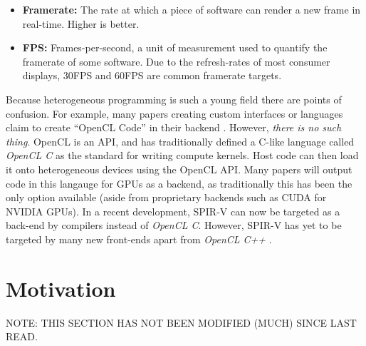 \documentclass[a4paper,12pt,twoside,openright]{report}
\begin{document}
\begin{itemize}
    \item \textbf{Framerate:} The rate at which a piece of software can render
    a new frame in real-time. Higher is better.

    \item \textbf{FPS:} Frames-per-second, a unit of measurement used to
    quantify the framerate of some software. Due to the refresh-rates of most
    consumer displays, 30FPS and 60FPS are common framerate targets.

\end{itemize}


Because heterogeneous programming is such a young field there are points of
confusion. For example, many papers creating custom interfaces or languages
claim to create ``OpenCL Code'' in their backend \cite{JITGPU} \cite{Lime2012}.
However, \textit{there is no such thing}. OpenCL is an API, and has
traditionally defined a C-like language called \textit{OpenCL C} as the
standard for writing compute kernels. Host code can then load it onto
heterogeneous devices using the OpenCL API. Many papers will output code in
this langauge for GPUs as a backend, as traditionally this has been the only
option available (aside from proprietary backends such as CUDA for NVIDIA
GPUs). In a recent development, SPIR-V can now be targeted as a back-end by
compilers instead of \textit{OpenCL C}. However, SPIR-V has yet to be targeted
by many new front-ends apart from \textit{OpenCL C++}
\cite{OpenCLCPPWhitePaper}.

\section{Motivation}


NOTE: THIS SECTION HAS NOT BEEN MODIFIED (MUCH) SINCE LAST READ.
\end{document}
